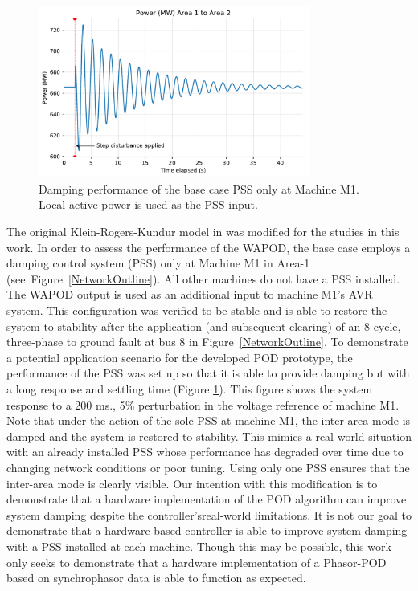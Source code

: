 \documentclass[journal]{IEEEtran}
\begin{document}
\begin{figure}[tbp]
\centering
\includegraphics[width=3.5in]{PSS_degraded_response.pdf}
\caption{Damping performance of the base case PSS only at Machine M1. Local active power is used as the PSS input.}
\label{PSS_Degrade}
\vspace{-1em}
\end{figure}

The original Klein-Rogers-Kundur model in \cite{KundurTwoArea} was modified for the studies in this work. In order to assess the performance of the WAPOD, the base case employs a damping control system (PSS) only at Machine M1 in Area-1 (see~Figure~\ref{NetworkOutline}). All other machines do not have a PSS installed. The WAPOD output is used as an additional input to machine M1\rq{s} AVR system. This configuration was  verified to be stable and is able to restore the system to stability after the application (and subsequent clearing) of an 8 cycle, three-phase to ground fault at bus 8 in Figure~\ref{NetworkOutline}. To demonstrate a potential application scenario for the developed POD prototype, the performance of the PSS was set up so that it is able to provide damping but with a long response and settling time (Figure \ref{PSS_Degrade}). This figure shows the system response to a 200 ms., 5\% perturbation in the voltage reference of machine M1. Note that under the action of the sole PSS at machine M1, the inter-area mode is damped and the system is restored to stability. This mimics a real-world situation with an already installed PSS whose performance has degraded over time due to changing network conditions or poor tuning. Using only one PSS ensures that the inter-area mode is clearly visible. Our intention with this modification is to demonstrate that a hardware implementation of the POD algorithm can improve system damping despite the controller\rq{s}real-world limitations. It is not our goal to demonstrate that a hardware-based controller is able to improve system damping with a PSS installed at each machine. Though this may be possible, this work only seeks to demonstrate that a hardware implementation of a Phasor-POD based on synchrophasor data is able to function as expected.
\end{document}
